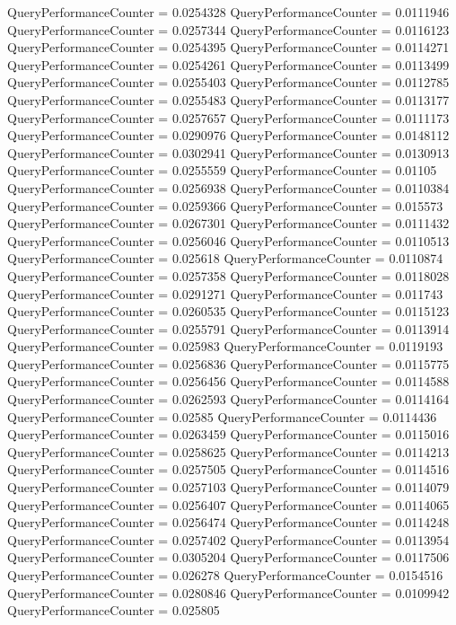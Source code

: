 \documentclass[9pt]{article}
\theoremstyle{plain}
\theoremstyle{definition}
\theoremstyle{remark}
\numberwithin{equation}{section}
\begin{document}
QueryPerformanceCounter  =  0.0254328
QueryPerformanceCounter  =  0.0111946
QueryPerformanceCounter  =  0.0257344
QueryPerformanceCounter  =  0.0116123
QueryPerformanceCounter  =  0.0254395
QueryPerformanceCounter  =  0.0114271
QueryPerformanceCounter  =  0.0254261
QueryPerformanceCounter  =  0.0113499
QueryPerformanceCounter  =  0.0255403
QueryPerformanceCounter  =  0.0112785
QueryPerformanceCounter  =  0.0255483
QueryPerformanceCounter  =  0.0113177
QueryPerformanceCounter  =  0.0257657
QueryPerformanceCounter  =  0.0111173
QueryPerformanceCounter  =  0.0290976
QueryPerformanceCounter  =  0.0148112
QueryPerformanceCounter  =  0.0302941
QueryPerformanceCounter  =  0.0130913
QueryPerformanceCounter  =  0.0255559
QueryPerformanceCounter  =  0.01105
QueryPerformanceCounter  =  0.0256938
QueryPerformanceCounter  =  0.0110384
QueryPerformanceCounter  =  0.0259366
QueryPerformanceCounter  =  0.015573
QueryPerformanceCounter  =  0.0267301
QueryPerformanceCounter  =  0.0111432
QueryPerformanceCounter  =  0.0256046
QueryPerformanceCounter  =  0.0110513
QueryPerformanceCounter  =  0.025618
QueryPerformanceCounter  =  0.0110874
QueryPerformanceCounter  =  0.0257358
QueryPerformanceCounter  =  0.0118028
QueryPerformanceCounter  =  0.0291271
QueryPerformanceCounter  =  0.011743
QueryPerformanceCounter  =  0.0260535
QueryPerformanceCounter  =  0.0115123
QueryPerformanceCounter  =  0.0255791
QueryPerformanceCounter  =  0.0113914
QueryPerformanceCounter  =  0.025983
QueryPerformanceCounter  =  0.0119193
QueryPerformanceCounter  =  0.0256836
QueryPerformanceCounter  =  0.0115775
QueryPerformanceCounter  =  0.0256456
QueryPerformanceCounter  =  0.0114588
QueryPerformanceCounter  =  0.0262593
QueryPerformanceCounter  =  0.0114164
QueryPerformanceCounter  =  0.02585
QueryPerformanceCounter  =  0.0114436
QueryPerformanceCounter  =  0.0263459
QueryPerformanceCounter  =  0.0115016
QueryPerformanceCounter  =  0.0258625
QueryPerformanceCounter  =  0.0114213
QueryPerformanceCounter  =  0.0257505
QueryPerformanceCounter  =  0.0114516
QueryPerformanceCounter  =  0.0257103
QueryPerformanceCounter  =  0.0114079
QueryPerformanceCounter  =  0.0256407
QueryPerformanceCounter  =  0.0114065
QueryPerformanceCounter  =  0.0256474
QueryPerformanceCounter  =  0.0114248
QueryPerformanceCounter  =  0.0257402
QueryPerformanceCounter  =  0.0113954
QueryPerformanceCounter  =  0.0305204
QueryPerformanceCounter  =  0.0117506
QueryPerformanceCounter  =  0.026278
QueryPerformanceCounter  =  0.0154516
QueryPerformanceCounter  =  0.0280846
QueryPerformanceCounter  =  0.0109942
QueryPerformanceCounter  =  0.025805
\end{document}
